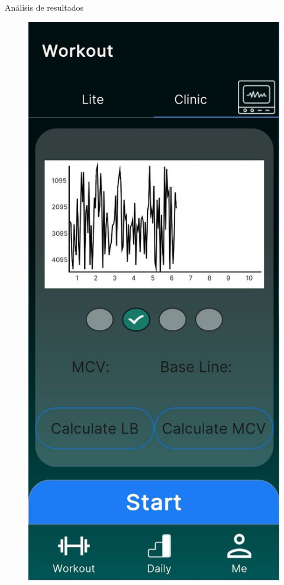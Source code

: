 \begin{thesischapter}{3} {Análisis de resultados}
\begin{figure}[ht]
        \includegraphics[scale=0.17]{images/ui/4.jpg}

\end{figure}
\end{thesischapter}
